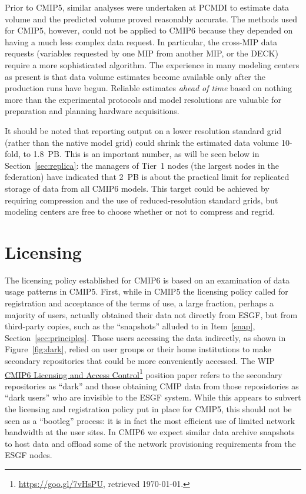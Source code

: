 \documentclass[gmd,manuscript]{copernicus}
\newcommand{\urlref}[2] {\href{#1}{#2}\footnote{\url{#1}, retrieved \today.}}
\begin{document}
Prior to CMIP5, similar analyses were undertaken at PCMDI to estimate data
volume and the predicted volume proved reasonably accurate. 
The methods used for CMIP5, however, could not be applied to CMIP6 because 
they depended on having a much less complex data request.  
In particular, the cross-MIP data requests (variables requested by one
MIP from another MIP, or the DECK) require a more sophisticated
algorithm. The experience in many
modeling centers as present is that data volume estimates become
available only after the production runs have begun. Reliable estimates
\emph{ahead of time} based on nothing more than the experimental
protocols and model resolutions are valuable for preparation and planning
hardware acquisitions.

It should be noted that reporting output on a lower resolution
standard grid (rather than the native model grid) could shrink the estimated
data volume 10-fold, to 1.8~PB. This is an important number, as will be
seen below in Section~\ref{sec:replica}: the managers of Tier~1 nodes
(the largest nodes in the federation) have indicated that 2~PB is
about the practical limit for replicated storage of  data from
all CMIP6 models.
This target could be achieved by requiring compression and the use of 
reduced-resolution standard grids, but
modeling centers are free to choose
whether or not to compress and regrid.

\section{Licensing}
\label{sec:licensing}

The licensing policy established for CMIP6 is based on an examination of
data usage patterns in CMIP5. First, while in CMIP5 the licensing policy called
for registration and acceptance of the terms of use, a large fraction,
perhaps a majority of users, actually obtained their data not directly
from ESGF, but from
third-party copies, such as the ``snapshots'' alluded to in
Item~\ref{snap}, Section~\ref{sec:principles}. Those users accessing
the data indirectly, as shown in Figure~\ref{fig:dark}, relied on user
groups or their home institutions to make secondary repositories that
could be more conveniently accessed. The WIP
\urlref{https://goo.gl/7vHsPU}{CMIP6 Licensing and Access Control}
position paper refers to the secondary repositories as ``dark'' and
those obtaining CMIP data from those reposistories as ``dark users''
who are invisible to the ESGF system. While this appears to subvert
the licensing and registration policy put in place for CMIP5, this
should not be seen as a ``bootleg'' process: it is in fact the most
efficient use of limited network bandwidth at the user sites.
In CMIP6 we expect similar data archive snapshots to host data and offload some of the
network provisioning requirements from the ESGF nodes.
\end{document}
